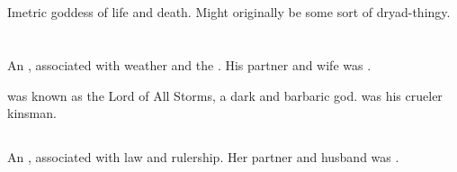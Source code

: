 \section{\NishiS}
\index{\NishiS}
Imetric goddess of life and death. 
Might originally be some sort of dryad-thingy. 






































\chapter{\Taorthae}















\section{\Daxian}
An , associated with weather and the \Wylde{}. 
His partner and wife was . 

\Daxian was known as the Lord of All Storms, a dark and barbaric god. 
 was his crueler kinsman. 













\section{\Isxae}
An , associated with law and rulership. 
Her partner and husband was . 















